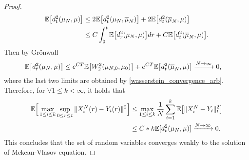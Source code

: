 \begin{proof}
  \begin{align*}
    \mathbb{E}\big[d_t^2(\mu_N,\mu )\big] &\le  2 \mathbb{E}\big[d_t^2(\mu_N,\overline{\mu }_N )\big] + 2 \mathbb{E}\big[d_t^2(\overline\mu_N,\mu )\big]\\
                          &\le  C \int_0^{t} \mathbb{E}\big[d_r^2(\mu_N,\mu )\big] dr + C\mathbb{E}\big[d_t^2(\overline{\mu}_N,\mu )\big]
  .\end{align*}
  Then by Grönwall 
  \begin{align*}
    \mathbb{E}\big[d_t^2(\mu_N,\mu )\big] &\le e^{CT} \mathbb{E}\big[W_2^2(\mu_{N,0},\mu_0)\big] + e^{CT} \mathbb{E}\big[d_t^2(\overline{\mu }_N,\mu  )\big] \xrightarrow{N\to \infty} 0 
,\end{align*}
 where the last two limits are obtained by \autoref{wasserstein_convergence_arb}. Therefore, for $\forall  1\le k < \infty$, it holds that
  \begin{align*}
    \mathbb{E}\Big[\max_{1\le i \le  k}\sup_{0\le r\le t} \|X_i^{N}(r) - Y_i(r) \|^2\Big] &\le \max_{1 \le i\le k} \frac{1}{N}\sum_{i=1}^{k} \mathbb{E}\big[\|X_i^{N}-Y_i \|_t^2\big] \\
         &\le  C*k\mathbb{E}[d_t^2(\mu_N,\mu   )]                                                                \xrightarrow{N\to \infty} 0
  .\end{align*}
  This concludes that the set of random variables converges weakly to the solution of Mckean-Vlasov equation.
\end{proof}
